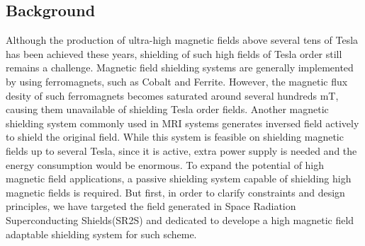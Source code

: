 \subsection{Background}
Although the production of ultra-high magnetic fields above several tens of Tesla has been achieved these years\cite{1_1_1},
shielding of such high fields of Tesla order still remains a challenge.
Magnetic field shielding systems are generally implemented by using ferromagnets, such as Cobalt and Ferrite.
However, the magnetic flux desity of such ferromagnets becomes saturated around several hundreds mT,
causing them unavailable of shielding Tesla order fields.
Another magnetic shielding system commonly used in MRI systems generates inversed field actively to shield the original field.
While this system is feasible on shielding magnetic fields up to several Tesla,
since it is active, extra power supply is needed and the energy consumption would be enormous.
To expand the potential of high magnetic field applications,
a passive shielding system capable of shielding high magnetic fields is required.
But first, in order to clarify constraints and design principles,
we have targeted the field generated in Space Radiation Superconducting Shields(SR2S) and dedicated to develope a high magnetic field adaptable shielding system for such scheme.

